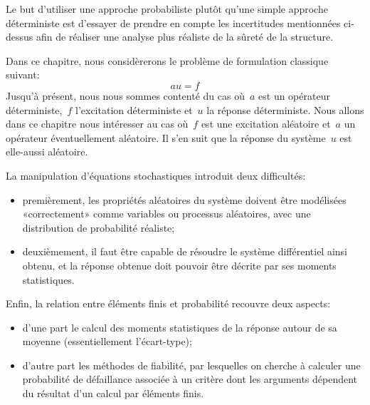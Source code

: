 Le but d'utiliser une approche probabiliste plutôt qu'une simple approche déterministe est d'essayer de prendre en compte les incertitudes mentionnées ci-dessus afin de réaliser une analyse plus réaliste de la sûreté de la structure.

\medskip
Dans ce chapitre, nous considèrerons le problème de formulation classique suivant:
\begin{equation}\label{Eq-Sto1}
au=f
\end{equation}
Jusqu'à présent, nous nous sommes contenté du cas où~$a$ est un opérateur déterministe,~$f$ l'excitation déterministe et~$u$ la réponse déterministe.
Nous allons dans ce chapitre nous intéresser au cas où~$f$ est une excitation aléatoire et~$a$ un opérateur éventuellement aléatoire. Il s'en suit que la réponse du système~$u$ est elle-aussi aléatoire.

\medskip
La manipulation d'équations stochastiques introduit deux difficultés:
\begin{itemize}
   \item premièrement, les propriétés aléatoires du système doivent être modélisées «correctement» comme variables ou processus aléatoires, avec une distribution de probabilité réaliste;
   \item deuxièmement, il faut être capable de résoudre le système différentiel ainsi obtenu, et la réponse obtenue doit pouvoir être décrite par ses moments statistiques.
\end{itemize}

\medskip
Enfin, la relation entre éléments finis et probabilité recouvre deux aspects:
\begin{itemize}
   \item d'une part le calcul des moments statistiques de la réponse autour de sa moyenne (essentiellement l'écart-type);
   \item d'autre part les méthodes de fiabilité, par lesquelles on cherche à calculer une probabilité de défaillance associée à un critère dont les arguments dépendent du résultat d'un calcul par éléments finis.
\end{itemize}

